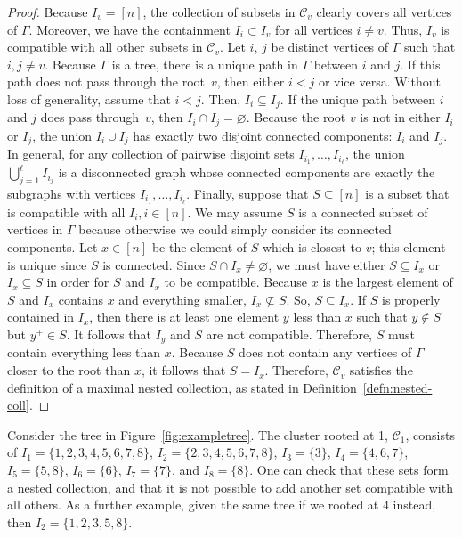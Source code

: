 \documentclass[10pt,a4paper]{amsart}
\numberwithin{equation}{section}
\newcommand{\new}[1]{{#1}}
\newcommand{\calC}{\mathcal{C}}
\begin{document}
\begin{proof}
Because $I_v = [n]$, the collection of subsets in $\mathcal{C}_{v}$ clearly covers all vertices of $\Gamma$. Moreover, we have the containment $I_{i} \subset I_{v}$ for all vertices $i \neq v$. Thus, $I_v$ is compatible with all other subsets in $\mathcal{C}_{v}$.
Let $i$, $j$ be distinct vertices of $\Gamma$ such that $i,j \neq v$. Because $\Gamma$ is a tree, there is a unique path in $\Gamma$ between $i$ and $j$. If this path does not pass through the root~$v$, then either $i < j$ or vice versa. Without loss of generality, assume that $i < j$. Then, $I_i \subseteq I_j$. If the unique path between $i$ and $j$ does pass through~$v$, then $I_i \cap I_j = \varnothing$. Because the root $v$ is not in either $I_i$ or $I_j$, the union $I_{i} \cup I_{j}$ has exactly two disjoint connected components: $I_i$ and $I_j$. In general, for any collection of pairwise disjoint sets $I_{i_1}, \dots, I_{i_\ell}$, the union $\bigcup_{j=1}^\ell I_{i_j}$ is a disconnected graph whose connected components are exactly the subgraphs with vertices $I_{i_1}, \dots, I_{i_\ell}$.
Finally, suppose that $S \subseteq [n]$ is a subset that is compatible with all $I_i, i \in [n]$. We may assume $S$ is a connected subset of vertices in $\Gamma$ because otherwise we could simply consider its connected components. Let $x \in [n]$ be the element of $S$ which is closest to $v$; this element is unique since $S$ is connected. Since $S \cap I_x \neq \varnothing$, we must have either $S \subseteq I_x$ or $I_x \subseteq S$ in order for $S$ and $I_x$ to be compatible. Because $x$ is the largest element of $S$ and $I_x$ contains $x$ and everything smaller, $I_x\not\subseteq S$. So, $S \subseteq I_x$. If $S$ is properly contained in $I_x$, then there is at least \new{one} element $y$ less than $x$ such that $y \notin S$ but $y^+ \in S$. It follows that $I_y$ and $S$ are not compatible. Therefore, $S$ must contain everything less than $x$. Because $S$ does not contain any vertices of $\Gamma$ closer to the root than $x$, it follows that $S = I_x$.
Therefore, $\mathcal{C}_{v}$ satisfies the definition of a maximal nested collection, as stated in Defini\-tion~\ref{defn:nested-coll}.
\end{proof}
\begin{Example}\label{ex:rooted-cluster}
Consider the tree in Figure~\ref{fig:exampletree}. The cluster rooted at 1, $\calC_1$, consists of $I_1 = \{1,2,3,4,5,6,7,8\}$, $I_2 = \{2,3,4,5,6,7,8\}$, $I_3 = \{3\}$, $I_4 = \{4,6,7\}$, $I_5 = \{5,8\}$, $I_6 = \{6\}$, $I_7 = \{7\}$, and $I_8 = \{8\}$. One can check that these sets form a nested collection, and that it is not possible to add another set compatible with all others.
As a further example, given the same tree if we rooted at $4$ instead, then $I_2 = \{1,2,3,5,8\}$.
\end{Example}
\end{document}
